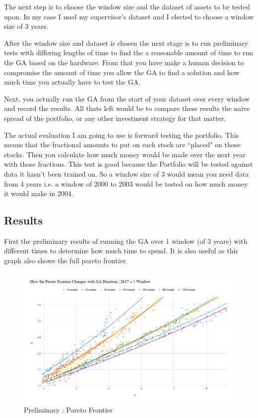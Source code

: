 \documentclass[11pt]{article}
\begin{document}
    The next step is to choose the window size and the dataset of assets to be tested upon.
    In my case I used my supervisor's dataset \cite{Dataset} and I elected to choose a window
    size of 3 years.

    After the window size and dataset is chosen the next stage is to run preliminary tests with
    differing lengths of time to find the a reasonable amount of time to run the GA based on
    the hardware. From that you have make a human decision to compromise the amount of time
    you allow the GA to find a solution and how much time you actually have to test the GA.

    Next, you actually run the GA from the start of your dataset over every window and record
    the results. All thats left would be to compare these results the naive spread of the
    portfolio, or any other investment strategy for that matter.

    The actual evaluation I am going to use is forward testing the portfolio. This means that
    the fractional amounts to put on each stock are ``placed" on those stocks. Then you
    calculate how much money would be made over the next year with those fractions. This test
    is good because the Portfolio will be tested against data it hasn't been trained on.
    So a window size of 3 would mean you need data from 4 years i.e. a window of 2000 to 2003
    would be tested on how much money it would make in 2004.

\subsection{Results}

    First the preliminary results of running the GA over 1 window (of 3 years) with different
    times to determine how much time to spend. It is also useful as this graph also shows
    the full pareto frontier.

    \begin{figure}[H] %
        \includegraphics[width=\textwidth]{HowTheParetoFrontierChangesWithGADuration_2017-1Window}
        \caption{Preliminary : Pareto Frontier}
            \label{fig:HowTheParetoFrontierChangesWithGADuration_2017-1Window}
    \end{figure}
\end{document}
